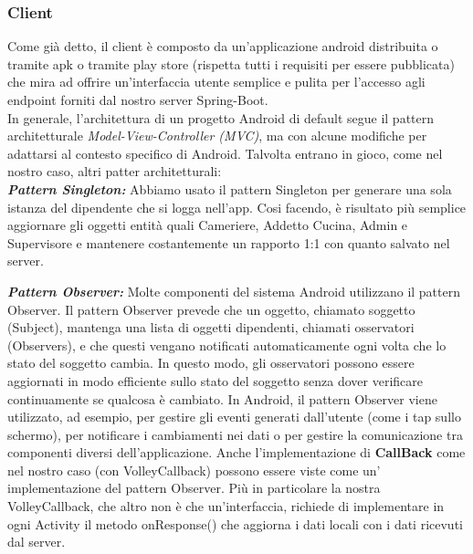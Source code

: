     \subsubsection{Client}
    \begin{flushleft}
        Come già detto, il client è composto da un'applicazione android distribuita o tramite apk o tramite play store (rispetta tutti i requisiti per essere pubblicata) che mira ad offrire un'interfaccia utente semplice e pulita 
        per l'accesso agli endpoint forniti dal nostro server Spring-Boot. \\
        In generale, l'architettura di un progetto Android di default segue il pattern architetturale \emph{Model-View-Controller (MVC)}, 
        ma con alcune modifiche per adattarsi al contesto specifico di Android. Talvolta entrano in gioco, come nel nostro caso, altri patter architetturali:\\
        \vspace{0.2cm}
        \textbf{\emph{Pattern Singleton:}} Abbiamo usato il pattern Singleton per generare una sola istanza del dipendente che si logga nell'app. 
        Cosi facendo, è risultato più semplice aggiornare gli oggetti entità quali Cameriere, Addetto Cucina, Admin e Supervisore e mantenere costantemente un rapporto 1:1 con quanto salvato nel server.\vspace{0.2cm}
        
        \textbf{\emph{Pattern Observer:}} Molte componenti del sistema Android utilizzano il pattern Observer. 
        Il pattern Observer prevede che un oggetto, chiamato soggetto (Subject), mantenga una lista di oggetti dipendenti, chiamati osservatori (Observers), 
        e che questi vengano notificati automaticamente ogni volta che lo stato del soggetto cambia. In questo modo, 
        gli osservatori possono essere aggiornati in modo efficiente sullo stato del soggetto senza dover verificare continuamente se qualcosa è cambiato.
        In Android, il pattern Observer viene utilizzato, ad esempio, per gestire gli eventi generati dall'utente (come i tap sullo schermo), per notificare i cambiamenti nei dati  o per gestire la comunicazione tra componenti diversi dell'applicazione.
        Anche l'implementazione di \textbf{CallBack} come nel nostro caso (con VolleyCallback) possono essere viste come un' implementazione del pattern Observer.
        Più in particolare la nostra VolleyCallback, che altro non è che un'interfaccia, richiede di implementare in ogni Activity il metodo onResponse() che aggiorna i dati locali con i dati ricevuti dal server.

    \end{flushleft}
    \vspace{0.2cm}



